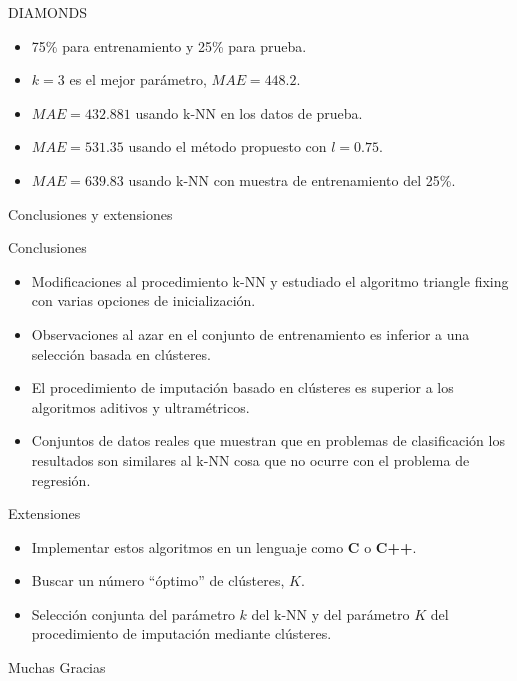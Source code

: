 \documentclass[10pt]{beamer}
\begin{document}
\begin{frame}{DIAMONDS}
{\begin{block}{}
\begin{itemize}
    \item 75$\%$ para entrenamiento y 25\% para prueba.
    \item $k = 3$ es el mejor parámetro, $MAE = 448.2$. 
    \item $MAE = 432.881$ usando k-NN en los datos de prueba.
    \item $MAE = 531.35$ usando el método propuesto con $l=0.75$.
    \item $MAE = 639.83$ usando k-NN con muestra de entrenamiento del 25\%.
\end{itemize}
\end{block}
}

\end{frame}

\begin{frame}{Conclusiones y extensiones}

\begin{block}{Conclusiones}
\begin{itemize}
     \item Modificaciones al procedimiento k-NN y estudiado el algoritmo triangle fixing con varias opciones de inicialización.
     \item Observaciones al azar en el conjunto de entrenamiento es inferior a una selección basada en clústeres.
     \item El procedimiento de imputación basado en clústeres es superior a los algoritmos aditivos y ultramétricos.
     \item Conjuntos de datos reales que muestran que en problemas de clasificación los resultados son similares al k-NN cosa que no ocurre con el problema de regresión.
\end{itemize}
\end{block}


\begin{block}{Extensiones}
\begin{itemize}
 \item Implementar estos algoritmos en un lenguaje como \textbf{\textsf{C}} o \textbf{\textsf{C++}}.
 \item Buscar un número ``óptimo'' de clústeres, $K$.
 \item Selección conjunta del parámetro $k$ del k-NN y del parámetro $K$ del procedimiento de imputación mediante clústeres.
\end{itemize}
\end{block}


\end{frame}

\begin{frame}
\begin{center}
{\Huge Muchas Gracias}
\end{center}
\end{frame}
\end{document}

